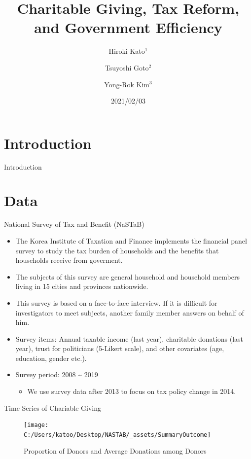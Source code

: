 \documentclass[
  ignorenonframetext,
]{beamer}
\title{Charitable Giving, Tax Reform, and Government Efficiency}
\author{ Hiroki Kato\(^1\)\and Tsuyoshi Goto\(^2\)\and Yong-Rok Kim\(^3\)}
\institute{\(^1\)Osaka University\and\(^2\)Chiba University\and\(^3\)Kobe University}
\date{2021/02/03}
\providecommand{\tightlist}{%
  \setlength{\itemsep}{0pt}\setlength{\parskip}{0pt}}
\begin{document}
\frame{\titlepage}

\begin{frame}
\end{frame}

\hypertarget{introduction}{%
\section{Introduction}\label{introduction}}

\begin{frame}{Introduction}
\protect\hypertarget{introduction-1}{}
\end{frame}

\hypertarget{data}{%
\section{Data}\label{data}}

\begin{frame}{National Survey of Tax and Benefit (NaSTaB)}
\protect\hypertarget{national-survey-of-tax-and-benefit-nastab}{}
\begin{itemize}
\tightlist
\item
  The Korea Institute of Taxation and Finance implements the financial panel survey to study the tax burden of households and the benefits that households receive from goverment.
\item
  The subjects of this survey are general household and household members living in 15 cities and provinces nationwide.
\item
  This survey is based on a face-to-face interview. If it is difficult for investigators to meet subjects, another family member answers on behalf of him.
\item
  Survey items: Annual taxable income (last year), charitable donations (last year), trust for politicians (5-Likert scale), and other covariates (age, education, gender etc.).
\item
  Survey period: 2008 \textasciitilde{} 2019

  \begin{itemize}
  \tightlist
  \item
    We use survey data after 2013 to focus on tax policy change in 2014.
  \end{itemize}
\end{itemize}
\end{frame}

\begin{frame}{Time Series of Chariable Giving}
\protect\hypertarget{time-series-of-chariable-giving}{}
\begin{figure}

{\centering \texttt{[image: C:/Users/katoo/Desktop/NASTAB/\_assets/SummaryOutcome]} 

}

\caption{Proportion of Donors and Average Donations among Donors}\label{fig:unnamed-chunk-1}
\end{figure}
\end{frame}
\end{document}
